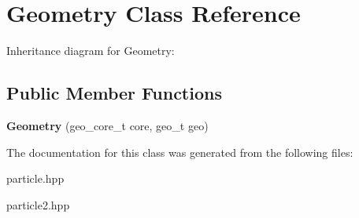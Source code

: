 \hypertarget{classGeometry}{}\section{Geometry Class Reference}
\label{classGeometry}


Inheritance diagram for Geometry\+:
\subsection*{Public Member Functions}
\begin{DoxyCompactItemize}
\item 
\mbox{\label{classGeometry_a3055e1ba2b0d9c4b0b980bbd4229aa27}} 
{\bfseries Geometry} (geo\+\_\+core\+\_\+t core, geo\+\_\+t geo)
\end{DoxyCompactItemize}


The documentation for this class was generated from the following files\+:\begin{DoxyCompactItemize}
\item 
particle.\+hpp\item 
particle2.\+hpp\end{DoxyCompactItemize}
